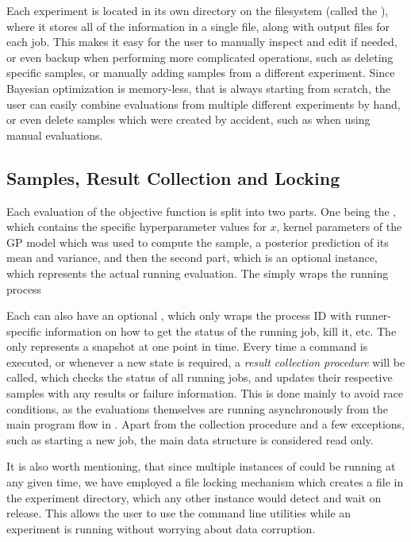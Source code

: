 Each \bopt experiment is located in its own directory on the filesystem (called the ), where it stores all of the information in a single  file, along with output files for each job. This makes it easy for the user to manually inspect and edit if needed, or even backup when performing more complicated operations, such as deleting specific samples, or manually adding samples from a different experiment. Since Bayesian optimization is memory-less, that is always starting from scratch, the user can easily combine evaluations from multiple different experiments by hand, or even delete samples which were created by accident, such as when using manual evaluations.



\subsection{Samples, Result Collection and Locking}

Each evaluation of the objective function is split into two parts. One being the , which contains the specific hyperparameter values for $x$, kernel parameters of the GP model which was used to compute the sample, a posterior prediction of its mean and variance, and then the second part, which is an optional  instance, which represents the actual running evaluation. The  simply wraps the running process 

Each  can also have an optional , which only wraps the process ID with runner-specific information on how to get the status of the running job, kill it, etc. The  only represents a snapshot at one point in time. Every time a \bopt command is executed, or whenever a new state is required, a \emph{result collection procedure} will be called, which checks the status of all running jobs, and updates their respective samples with any results or failure information. This is done mainly to avoid race conditions, as the evaluations themselves are running asynchronously from the main program flow in \bopt. Apart from the collection procedure and a few exceptions, such as starting a new job, the main data structure is considered read only.

It is also worth mentioning, that since multiple instances of \bopt could be running at any given time, we have employed a file locking mechanism which creates a  file in the experiment directory, which any other \bopt instance would detect and wait on release. This allows the user to use the command line utilities while an experiment is running without worrying about data corruption.


